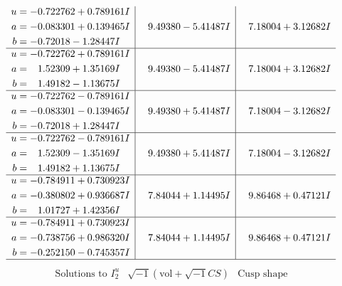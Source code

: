 \documentclass[1p]{elsarticle_modified}
\theoremstyle{definition}
\newcommand{\I}{\sqrt{-1}}
\begin{document}
$$\begin{array}{c|c|c}
\begin{aligned}
u &= -0.722762 + 0.789161 I \\
a &= -0.083301 + 0.139465 I \\
b &= -0.72018 - 1.28447 I\end{aligned}
 & \phantom{-}9.49380 - 5.41487 I & \phantom{-}7.18004 + 3.12682 I \\ \hline\begin{aligned}
u &= -0.722762 + 0.789161 I \\
a &= \phantom{-}1.52309 + 1.35169 I \\
b &= \phantom{-}1.49182 - 1.13675 I\end{aligned}
 & \phantom{-}9.49380 - 5.41487 I & \phantom{-}7.18004 + 3.12682 I \\ \hline\begin{aligned}
u &= -0.722762 - 0.789161 I \\
a &= -0.083301 - 0.139465 I \\
b &= -0.72018 + 1.28447 I\end{aligned}
 & \phantom{-}9.49380 + 5.41487 I & \phantom{-}7.18004 - 3.12682 I \\ \hline\begin{aligned}
u &= -0.722762 - 0.789161 I \\
a &= \phantom{-}1.52309 - 1.35169 I \\
b &= \phantom{-}1.49182 + 1.13675 I\end{aligned}
 & \phantom{-}9.49380 + 5.41487 I & \phantom{-}7.18004 - 3.12682 I \\ \hline\begin{aligned}
u &= -0.784911 + 0.730923 I \\
a &= -0.380802 + 0.936687 I \\
b &= \phantom{-}1.01727 + 1.42356 I\end{aligned}
 & \phantom{-}7.84044 + 1.14495 I & \phantom{-}9.86468 + 0.47121 I \\ \hline\begin{aligned}
u &= -0.784911 + 0.730923 I \\
a &= -0.738756 + 0.986320 I \\
b &= -0.252150 - 0.745357 I\end{aligned}
 & \phantom{-}7.84044 + 1.14495 I & \phantom{-}9.86468 + 0.47121 I\\
 \hline 
 \end{array}$$\newpage$$\begin{array}{c|c|c}  
\text{Solutions to }I^u_{2}& \I (\text{vol} + \sqrt{-1}CS) & \text{Cusp shape}\\

\end{array}$$
\end{document}
